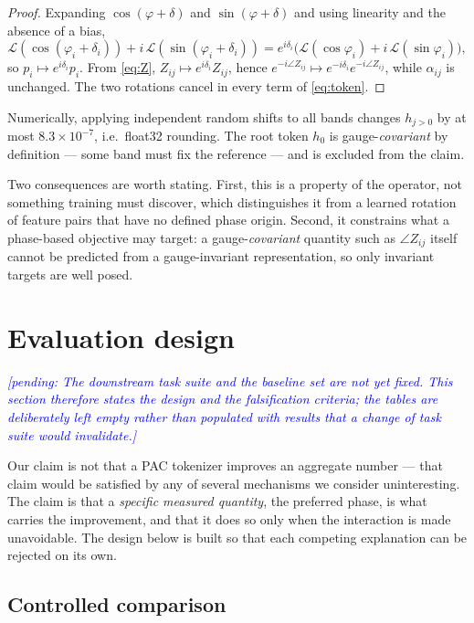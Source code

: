 \documentclass{article}
\newcommand{\pending}[1]{\textcolor{blue}{\textit{[pending: #1]}}}
\begin{document}
\begin{proof}
Expanding $\cos(\varphi+\delta)$ and $\sin(\varphi+\delta)$ and using linearity
and the absence of a bias,
\[
\mathcal{L}(\cos(\varphi_i{+}\delta_i)) + i\,\mathcal{L}(\sin(\varphi_i{+}\delta_i))
= e^{i\delta_i}\bigl(\mathcal{L}(\cos\varphi_i) + i\,\mathcal{L}(\sin\varphi_i)\bigr),
\]
so $p_i \mapsto e^{i\delta_i} p_i$. From \eqref{eq:Z}, $Z_{ij} \mapsto e^{i\delta_i} Z_{ij}$,
hence $e^{-i\angle Z_{ij}} \mapsto e^{-i\delta_i} e^{-i\angle Z_{ij}}$, while
$\alpha_{ij}$ is unchanged. The two rotations cancel in every term of
\eqref{eq:token}.
\end{proof}

Numerically, applying independent random shifts to all bands changes
$h_{j>0}$ by at most $8.3\times 10^{-7}$, i.e.\ float32 rounding. The root
token $h_0$ is gauge-\emph{covariant} by definition --- some band must fix the
reference --- and is excluded from the claim.

Two consequences are worth stating. First, this is a property of the operator,
not something training must discover, which distinguishes it from a learned
rotation of feature pairs that have no defined phase origin. Second, it
constrains what a phase-based objective may target: a gauge-\emph{covariant}
quantity such as $\angle Z_{ij}$ itself cannot be predicted from a
gauge-invariant representation, so only invariant targets are well posed.

\section{Evaluation design}
\label{sec:eval}

\pending{The downstream task suite and the baseline set are not yet fixed. This
section therefore states the design and the falsification criteria; the tables
are deliberately left empty rather than populated with results that a change of
task suite would invalidate.}

Our claim is not that a PAC tokenizer improves an aggregate number --- that
claim would be satisfied by any of several mechanisms we consider uninteresting.
The claim is that a \emph{specific measured quantity}, the preferred phase, is
what carries the improvement, and that it does so only when the interaction is
made unavoidable. The design below is built so that each competing explanation
can be rejected on its own.

\subsection{Controlled comparison}
\end{document}
